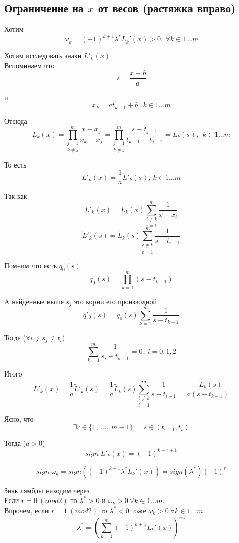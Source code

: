 \documentclass[12pt,a4paper]{article}
\begin{document}
	
	\subsection{Ограничение на $x$ от весов (растяжка вправо)}
	\noindent Хотим
	\[
	\omega_k  = (-1)^{k+1} \lambda^* L_k'(x) > 0 , \ \forall k \in 1 \ldots m 
	\]
	
	
	
	\noindent Хотим исследовать знаки $L'_k(x)$\\
	Вспоминаем что
	\[
	s = \frac{x-b}{a}
	\]
	
	\noindent и 
	\[
	x_k = a t_{k-1} + b, \ k \in 1 \ldots m
	\]
	
	\noindent Отсюда
	\[
	L_k(x) = 
	\underset{k \neq j}{\prod_{j=1}^{m}} \frac{x - x_j}{x_k - x_j} = 
	\underset{k \neq j}{\prod_{j=1}^{m}} \frac{s - t_{j-1}}{t_{k-1} - t_{j-1}} =
	\tilde{L}_k(s), \
	\ k \in 1 \ldots m
	\]
	
	\noindent То есть
	\[
	\boxed{
	L'_k(x) = \frac{1}{a} \tilde{L}'_k(s) , 
	\ k \in 1 \ldots m}
	\]
	
	\noindent Так как
	\[
	L'_k(x) = L_k(x)\underset{i=1}{\sum_{i \neq k}^m} \frac{1}{x-x_i}
	\]
	\[
	\tilde{L}'_k(s) = \tilde{L}_k(s)\underset{i=1}{\sum_{i \neq k}^m} \frac{1}{s-t_{i-1}}
	\]
	
	\noindent Помним что есть $q_0(s)$ 
	\[
	q_0(s) = \prod_{k=1}^{m} \left( s - t_{k-1} \right)
	\]
	
	\noindent A найденные выше $s_j$ это корни его производной
	\[
	q'_0(s) = q_0(s)\sum_{k=1}^{m} \frac{1}{s - t_{k-1}}  
	\]
	
	\noindent Тогда ($ \forall i,j \ \ s_j \neq t_i $)
	\[
	\sum_{k=1}^{m} \frac{1}{s_i - t_{k-1}}  = 0, \ i=0,1,2
	\]
	
	\noindent Итого
	\[
	L'_k(x) = 
	\frac{1}{a} \tilde{L}'_k(s) =
	\frac{1}{a} \tilde{L}_k(s) \underset{i=1}{\sum_{i \neq k}^m} \frac{1}{s-t_{i-1}} =
	\frac{-\tilde{L}_k(s)}{a(s-t_{k-1})}
	\]
	
	\noindent Ясно, что
	\[
	\exists r \in \lbrace 1, \ \ldots, \ m-1 \rbrace : \quad s \in (t_{r-1}, t_r)
	\]
	
	\noindent Тогда ($a>0$)
	\[
		sign \ L'_k(x) = (-1)^{k+r+1}
	\]
	
	\[
	sign \ \omega_k  = 
	sign \left( (-1)^{k+1} \lambda^* L_k'(x) \right) =
	sign (  \lambda^* )(-1)^r
	\]
	
	\noindent Знак лямбды находим через\\
	Если $r=0 \ (mod2)$ то $\lambda^*>0$ и $\omega_k > 0 \ \forall k \in 1 \ldots m$.\\
	 Впрочем, если $r=1 \ (mod2)$ то $\lambda^*<0$ тоже $\omega_k > 0 \ \forall k \in 1 \ldots m$
	\[
	\lambda^* = \left( \sum_{k=1}^{m} (-1)^{k+1}  L_k'(x) \right) ^ {-1}
	\]
	
\end{document}
